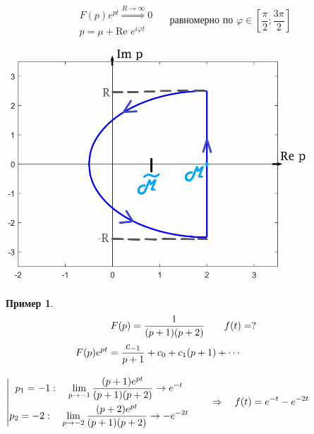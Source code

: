 \documentclass[oneside, final, 12pt]{article}
\theoremstyle{def}
\newtheorem{example}{Пример}[section]
\begin{document}
	\begin{minipage}{0.6\textwidth}	
		$$
			\begin{gathered}
				F(p)e^{pt} \stackrel{R \rightarrow \infty}{\Rightarrow} 0 \\
				p = \mu + \textrm{Re } e^{i\varphi t}
			\end{gathered} \quad \text{ равномерно по } \varphi \in \left[\frac{\pi}{2}; \frac{3\pi}{2}\right]
		$$
	\end{minipage}
	\hfill
	\begin{minipage}{0.4\textwidth}	
		\includegraphics[width=0.85\textwidth]{pict/analit_pict.png}
	\end{minipage} \newline
	\noindent
	\begin{example}
	$$		
			F(p) = \dfrac{1}{(p+1)(p+2)} \qquad f(t) = ? \vspace{2mm}
	$$
	$
		\begin{gathered}
			F(p)e^{pt} = \dfrac{c_{-1}}{p+1} +c_0 + c_1(p+1) + \cdots  \vspace{3mm} \\
			\left| \begin{gathered}
						p_1 = -1: \quad \lim_{p\to-1}\dfrac{(p+1)e^{pt}}{(p+1)(p+2)} \rightarrow e^{-t} \\
						p_2 = -2: \quad \lim_{p\to-2}\dfrac{(p+2)e^{pt}}{(p+1)(p+2)} \rightarrow -e^{-2t}
					\end{gathered} \right. \qquad \Rightarrow \quad
						f(t) = e^{-t} -  e^{-2t} \vspace{2mm}\\			
		\end{gathered}  
	$\newline
	\end{example}
\end{document}
